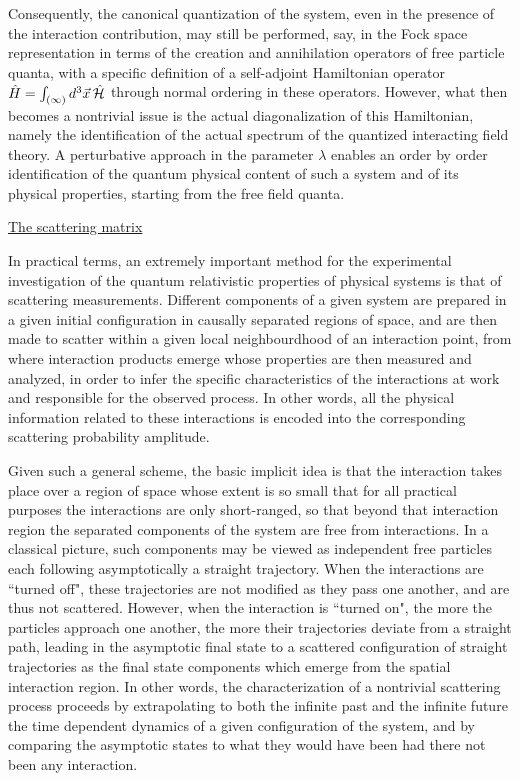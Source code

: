 \documentclass[a4paper,11pt]{article}
\begin{document}
Consequently, the canonical quantization of the system, even in the 
pre\-sen\-ce of the interaction contribution, may still be performed, say, 
in the Fock space representation in terms of the creation and annihilation
operators of free particle quanta, with a specific definition of a
self-adjoint Hamiltonian operator $\hat{H}=\int_{(\infty)}d^3\vec{x}\,
\hat{\cal H}$ through normal ordering in these operators. However, what
then becomes a nontrivial issue is the actual diagonalization of
this Hamiltonian, namely the identification of the actual spectrum
of the quantized interacting field theory. A perturbative approach in
the parameter $\lambda$ enables an order by order identification of
the quantum physical content of such a system and of its physical properties,
starting from the free field quanta.

\vspace{15pt}

\noindent\underline{The scattering matrix}

\vspace{10pt}

In practical terms, an extremely important method for the experimental 
investigation of the quantum relativistic properties of physical systems is 
that of scattering measurements. Different components of a given system are
prepared in a given initial configuration in causally separated regions of
space, and are then made to scatter within a given local neighbourdhood of
an interaction point, from where interaction products emerge whose properties
are then measured and analyzed, in order to infer the specific characteristics
of the interactions at work and responsible for the observed process.
In other words, all the physical information related to these interactions
is encoded into the corresponding scattering probability amplitude.

Given such a general scheme, the basic implicit idea is that the interaction
takes place over a region of space whose extent is so small that for all
practical purposes the interactions are only short-ranged, so that beyond
that interaction region the separated components of the system are free
from interactions. In a classical picture, such components may be viewed as
independent free particles each following asymptotically a straight 
trajectory. When the interactions are ``turned off", these trajectories are 
not modified as they pass one another, and are thus not scattered. 
However, when the interaction is ``turned on", the more the particles 
approach one another, the more their trajectories deviate from a straight 
path, leading in the asymptotic final state to a scattered configuration of 
straight trajectories as the final state components which emerge from the 
spatial interaction region. In other words, the cha\-rac\-te\-ri\-za\-tion of a 
nontrivial scattering process proceeds by extrapolating to both the infinite 
past and the infinite future the time dependent dynamics of a given 
configuration of the system, and by comparing the asymptotic states to what 
they would have been had there not been any interaction.
\end{document}
